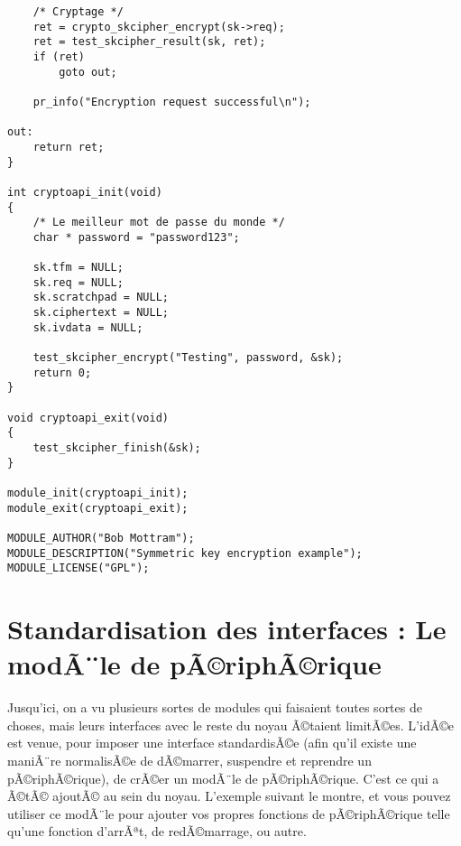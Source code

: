 \documentclass[11pt]{article}
\begin{document}
\begin{verbatim}
    /* Cryptage */
    ret = crypto_skcipher_encrypt(sk->req);
    ret = test_skcipher_result(sk, ret);
    if (ret)
        goto out;

    pr_info("Encryption request successful\n");

out:
    return ret;
}

int cryptoapi_init(void)
{
    /* Le meilleur mot de passe du monde */
    char * password = "password123";

    sk.tfm = NULL;
    sk.req = NULL;
    sk.scratchpad = NULL;
    sk.ciphertext = NULL;
    sk.ivdata = NULL;

    test_skcipher_encrypt("Testing", password, &sk);
    return 0;
}

void cryptoapi_exit(void)
{
    test_skcipher_finish(&sk);
}

module_init(cryptoapi_init);
module_exit(cryptoapi_exit);

MODULE_AUTHOR("Bob Mottram");
MODULE_DESCRIPTION("Symmetric key encryption example");
MODULE_LICENSE("GPL");
\end{verbatim}

\section*{Standardisation des interfaces : Le modÃ¨le de pÃ©riphÃ©rique}
\label{sec-17}

Jusqu'ici, on a vu plusieurs sortes de modules qui faisaient toutes sortes de choses, mais leurs interfaces avec le reste du noyau Ã©taient limitÃ©es. L'idÃ©e est venue, pour imposer une interface standardisÃ©e (afin qu'il existe une maniÃ¨re normalisÃ©e de dÃ©marrer, suspendre et reprendre un pÃ©riphÃ©rique), de crÃ©er un modÃ¨le de pÃ©riphÃ©rique. C'est ce qui a Ã©tÃ© ajoutÃ© au sein du noyau. L'exemple suivant le montre, et vous pouvez utiliser ce modÃ¨le pour ajouter vos propres fonctions de pÃ©riphÃ©rique telle qu'une fonction d'arrÃªt, de redÃ©marrage, ou autre.
\end{document}
